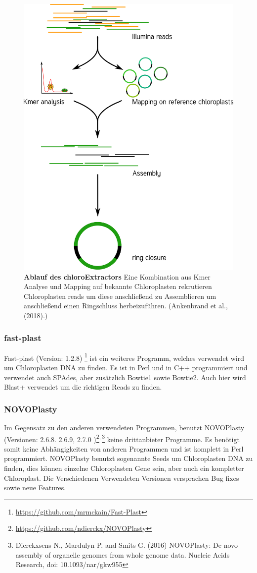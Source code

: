 \documentclass{scrartcl}
\begin{document}
\begin{figure}
\includegraphics[width=.9\linewidth]{./workflow.png}
\caption[Ablauf des chloroExtractors]{\textbf{Ablauf des chloroExtractors} Eine Kombination aus Kmer Analyse und Mapping auf bekannte Chloroplasten rekrutieren Chloroplasten reads um diese anschließend zu Assemblieren um anschließend einen Ringschluss herbeizuführen. (Ankenbrand et al., (2018).)}
\end{figure}

\subsubsection{fast-plast}
\label{sec-2-5-2}
Fast-plast  (Version: 1.2.8) \footnote{\url{https://github.com/mrmckain/Fast-Plast}} ist ein weiteres Programm, welches verwendet wird um Chloroplasten DNA zu finden. Es ist in Perl und in C++ programmiert und verwendet auch SPAdes, 
aber zusätzlich Bowtie1 sowie Bowtie2. Auch hier wird Blast+ verwendet um die richtigen Reads zu finden. 
\subsubsection{NOVOPlasty}
\label{sec-2-5-3}
Im Gegensatz zu den anderen verwendeten Programmen, benutzt NOVOPlasty (Versionen: 2.6.8. 2.6.9, 2.7.0 )\footnote{\url{https://github.com/ndierckx/NOVOPlasty}}\textsuperscript{,}\,\footnote{Dierckxsens N., Mardulyn P. and Smits G. (2016) NOVOPlasty: De novo assembly of organelle genomes from whole genome data. Nucleic Acids Research, doi: 10.1093/nar/gkw955} keine drittanbieter Programme. Es benötigt somit keine Abhängigkeiten von anderen Programmen
und ist komplett in Perl programmiert. NOVOPlasty benutzt sogenannte Seeds um Chloroplasten DNA zu finden, dies können einzelne Chloroplasten Gene sein, aber auch ein kompletter Chloroplast.
Die Verschiedenen Verwendeten Versionen versprachen Bug fixes sowie neue Features. 
\end{document}
